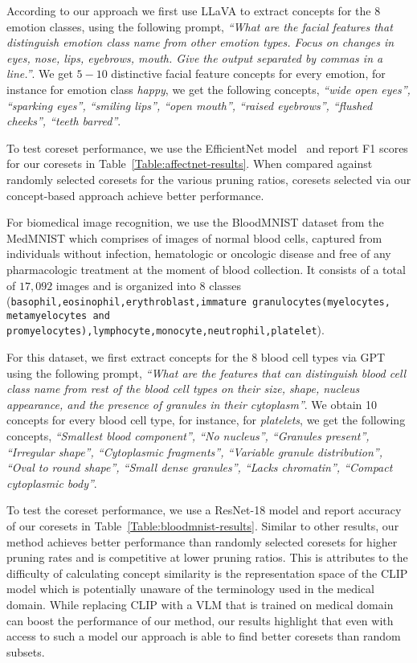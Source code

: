 According to our approach we first use LLaVA to extract concepts for the 8 emotion classes, using the following prompt, \textit{``What are the facial features that distinguish {emotion class name} from other emotion types. Focus on changes in eyes, nose, lips, eyebrows, mouth. Give the output separated by commas in a line.''}. 
We get $5-10$ distinctive facial feature concepts for every emotion, for instance for emotion class \textit{happy}, we get the following concepts, \textit{``wide open eyes'', ``sparking eyes'', ``smiling lips'', ``open mouth'', ``raised eyebrows'', ``flushed cheeks'', ``teeth barred''}. 

To test coreset performance, we use the EfficientNet model~\cite{tan2019efficientnet} and report F1 scores for our coresets in Table~\ref{Table:affectnet-results}. When compared against randomly selected coresets for the various pruning ratios, coresets selected via our concept-based approach achieve better performance. 


For biomedical image recognition, we use the BloodMNIST \cite{acevedo2020dataset} dataset from the MedMNIST \cite{medmnistv1,medmnistv2} which comprises of images of normal blood cells, captured from individuals without infection, hematologic or oncologic disease and free of any pharmacologic treatment at the moment of blood collection. 
It consists of a total of $17,092$ images and is organized into 8 classes (\texttt{basophil,eosinophil,erythroblast,immature granulocytes(myelocytes, metamyelocytes and promyelocytes),lymphocyte,monocyte,neutrophil,platelet}).

For this dataset, we first extract concepts for the 8 blood cell types via GPT using the following prompt, \textit{``What are the features that can distinguish {blood cell class name} from rest of the blood cell types on their size, shape, nucleus appearance, and the presence of granules in their cytoplasm''}.
We obtain 10 concepts for every blood cell type, for instance, for \textit{platelets}, we get the following concepts, \textit{``Smallest blood component'', ``No nucleus'', ``Granules present'', ``Irregular shape'', ``Cytoplasmic fragments'', ``Variable granule distribution'', ``Oval to round shape'', ``Small dense granules'', ``Lacks chromatin'', ``Compact cytoplasmic body''}. 

To test the coreset performance, we use a ResNet-18 model and report accuracy of our coresets in Table~\ref{Table:bloodmnist-results}. 
Similar to other results, our method achieves better performance than randomly selected coresets for higher pruning rates and is competitive at lower pruning ratios.
This is attributes to the difficulty of calculating concept similarity is the representation space of the CLIP model which is potentially unaware of the terminology used in the medical domain. While replacing CLIP with a VLM that is trained on medical domain can boost the performance of our method, our results highlight that even with access to such a model our approach is able to find better coresets than random subsets. 

